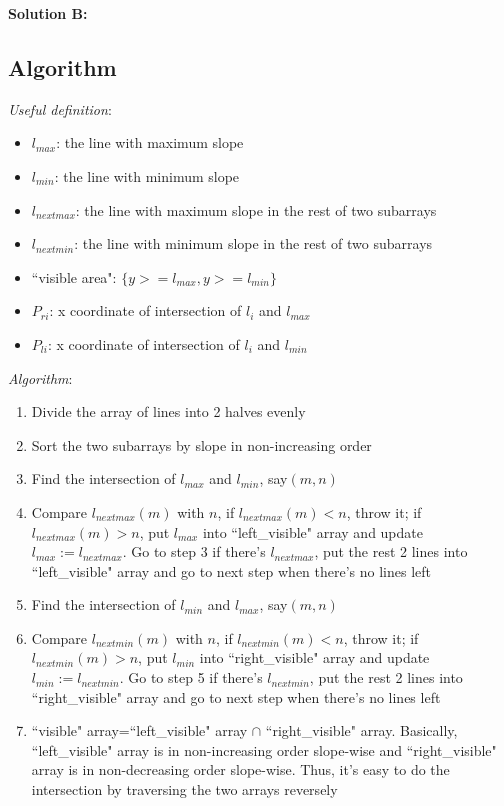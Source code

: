 \documentclass[11pt]{article}
\begin{document}
{\bf Solution B:}

\subsection{Algorithm}
\emph{Useful definition}:
\begin{itemize}
	\item $l_{max}$: the line with maximum slope
	\item $l_{min}$: the line with minimum slope
	\item $l_{nextmax}$: the line with maximum slope in the rest of two subarrays
	\item $l_{nextmin}$: the line with minimum slope in the rest of two subarrays
	\item ``visible area": $\{y>=l_{max}, y>=l_{min}\}$
	\item $P_{ri}$: x coordinate of intersection of $l_{i}$ and $l_{max}$
	\item $P_{li}$: x coordinate of intersection of $l_{i}$ and $l_{min}$
\end{itemize}
\emph{Algorithm}:
\begin{enumerate}
	\item Divide the array of lines into 2 halves evenly
	\item Sort the two subarrays by slope in non-increasing order
	\item Find the intersection of $l_{max}$ and $l_{min}$, say$(m, n)$
	\item Compare $l_{nextmax}(m)$ with $n$,  if $l_{nextmax}(m) < n$, throw it; if $l_{nextmax}(m) > n$, put $l_{max}$ into ``left\_visible" array and update $l_{max} := l_{nextmax}$. Go to step 3 if there's $l_{nextmax}$, put the rest 2 lines into ``left\_visible" array and go to next step when there's no lines left
	\item Find the intersection of $l_{min}$ and $l_{max}$, say$(m, n)$
	\item Compare $l_{nextmin}(m)$ with $n$,  if $l_{nextmin}(m) < n$, throw it; if $l_{nextmin}(m) > n$, put $l_{min}$ into ``right\_visible" array and update $l_{min} := l_{nextmin}$. Go to step 5 if there's $l_{nextmin}$, put the rest 2 lines into ``right\_visible" array and go to next step when there's no lines left
	\item ``visible" array=``left\_visible" array $\cap$ ``right\_visible" array. Basically, ``left\_visible" array is in non-increasing order slope-wise and ``right\_visible" array is in non-decreasing order slope-wise. Thus, it's easy to do the intersection by traversing the two arrays reversely
\end{enumerate}
\end{document}

